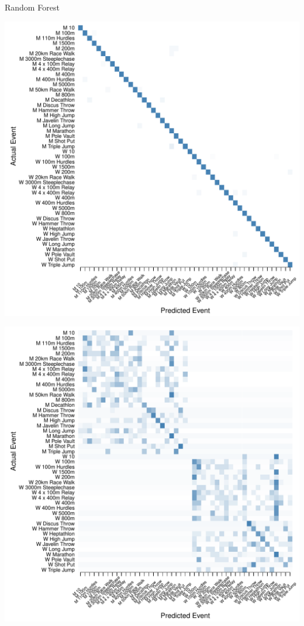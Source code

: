 \documentclass[landscape, paperwidth=42in, paperheight=36in,
fontscale=.35, margin=1in]{baposter}
\begin{document}
\begin{poster}
{\begin{center}
  Random Forest \\
  \begin{minipage}{0.45\textwidth}
    \begin{center}
      \includegraphics[scale=0.27]{../graphics/athletesRF-trn.pdf}
    \end{center}
  \end{minipage}
  \hspace{0.05\textwidth}
  \begin{minipage}{0.45\textwidth}
    \begin{center}
      \includegraphics[scale=0.27]{../graphics/athletesRF-tst.pdf}
    \end{center}
  \end{minipage}



\end{center}}
\end{poster}
\end{document}

